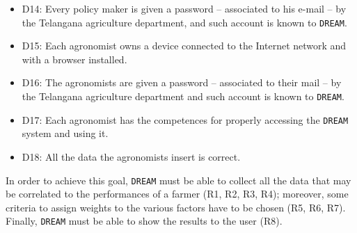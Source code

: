 \documentclass{article}
\begin{document}
\begin{itemize}
    \item D14: Every policy maker is given a password – associated to his e-mail – by the Telangana agriculture department, and such account is known to \verb|DREAM|.
  
    \item D15: Each agronomist owns a device connected to the Internet network and with a browser installed.
  
    \item D16: The agronomists are given a password – associated to their mail – by the Telangana agriculture department and such account is known to \verb|DREAM|.
  
    \item D17: Each agronomist has the competences for properly accessing the \verb|DREAM| system and using it.
   
    \item D18: All the data the agronomists insert is correct.
  
\end{itemize}

In order to achieve this goal, \verb|DREAM| must be able to collect all the data that may be correlated to the performances of a farmer (R1, R2, R3, R4); moreover, some criteria to assign weights to the various factors have to be chosen (R5, R6, R7). Finally, \verb|DREAM| must be able to show the results to the user (R8).
\end{document}
